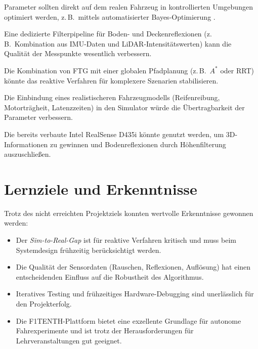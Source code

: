 \begin{description}[leftmargin=*]
  \item[Systematisches Hardware-Tuning:]
        Parameter sollten direkt auf dem realen Fahrzeug in kontrollierten
        Umgebungen optimiert werden, z.\,B.\ mittels automatisierter
        Bayes-Optimierung \cite{snoek2012practical}.
  \item[Sensorvorverarbeitung:]
        Eine dedizierte Filterpipeline für Boden- und
        Decken\-reflexionen (z.\,B.\ Kombination aus IMU-Daten und
        LiDAR-Intensitätswerten) kann die Qualität der Messpunkte
        wesentlich verbessern.
  \item[Hybridansatz:]
        Die Kombination von FTG mit einer globalen Pfadplanung
        (z.\,B.\ $A^*$ oder RRT) könnte das reaktive Verfahren
        für komplexere Szenarien stabilisieren.
  \item[Genaueres Simulationsmodell:]
        Die Einbindung eines realistischeren Fahrzeugmodells
        (Reifenreibung, Motorträgheit, Latenzzeiten) in den
        Simulator würde die Übertragbarkeit der Parameter verbessern.
  \item[Tiefenkamera:]
        Die bereits verbaute Intel RealSense D435i könnte genutzt
        werden, um 3D-Informationen zu gewinnen und
        Boden\-reflexionen durch Höhenfilterung auszuschließen.
\end{description}

\section{Lernziele und Erkenntnisse}
\label{sec:lessons}

Trotz des nicht erreichten Projektziels konnten wertvolle
Erkenntnisse gewonnen werden:

\begin{itemize}
  \item Der \emph{Sim-to-Real-Gap} ist für reaktive Verfahren
        kritisch und muss beim Systemdesign frühzeitig
        berücksichtigt werden.
  \item Die Qualität der Sensordaten (Rauschen, Reflexionen,
        Auflösung) hat einen entscheidenden Einfluss auf die
        Robustheit des Algorithmus.
  \item Iteratives Testing und frühzeitiges Hardware-Debugging
        sind unerlässlich für den Projekterfolg.
  \item Die F1TENTH-Plattform bietet eine exzellente Grundlage für
        autonome Fahrexperimente und ist trotz der Herausforderungen
        für Lehrveranstaltungen gut geeignet.
\end{itemize}
